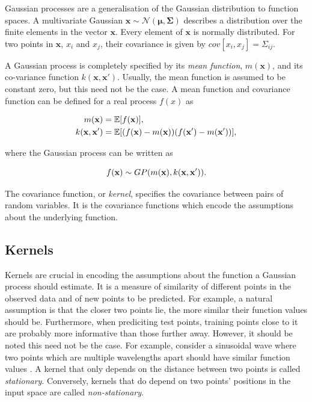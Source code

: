 \documentclass[12pt,a4paper]{report}
\theoremstyle{definition}
\begin{document}
Gaussian processes are a generalisation of the Gaussian distribution to function spaces. 
A multivariate Gaussian $\textbf{x} \sim \mathcal{N} (\boldsymbol{\mu}, \boldsymbol{\Sigma})$ describes a distribution over the finite elements in the vector $\textbf{x}$. 
Every element of $\textbf{x}$ is normally distributed. 
For two points in $\textbf{x}$, $x_{i}$ and $x_{j}$, their covariance is given by $cov[x_{i}, x_{j}] = \Sigma_{ij}$.

A Gaussian process is completely specified by its \emph{mean function}, $m(\textbf{x})$, and its co-variance function $k(\textbf{x}, \textbf{x}')$.
Usually, the mean function is assumed to be constant zero, but this need not be the case.
A mean function and covariance function can be defined for a real process $f(x)$ as 

\begin{equation}
	\begin{aligned}
		\centering
		m(\textbf{x}) &= \mathbb{E}[f(\textbf{x})],\\
		k(\textbf{x}, \textbf{x}') &= \mathbb{E}[(f(\textbf{x}) - m(\textbf{x}))(f(\textbf{x}') - m(\textbf{x}'))],
	\end{aligned}
\end{equation}

where the Gaussian process can be written as 

\begin{equation}
	\centering
	f(\textbf{x}) \sim GP(m(\textbf{x}), k(\textbf{x}, \textbf{x}')).
\end{equation}

The covariance function, or \emph{kernel}, specifies the covariance between pairs of random variables. It is the covariance functions which encode the assumptions about the underlying function.

\subsection{Kernels} \label{sec:Kernels}

Kernels are crucial in encoding the assumptions about the function a Gaussian process should estimate. 
It is a measure of similarity of different points in the observed data and of new points to be predicted. 
For example, a natural assumption is that the closer two points lie, the more similar their function values should be. 
Furthermore, when prediciting test points, training points close to it are probably more informative than those further away. 
However, it should be noted this need not be the case. 
For example, consider a sinusoidal wave where two points which are multiple wavelengths apart should have similar function values \citep{Kaiser2017}.
A kernel that only depends on the distance between two points is called \emph{stationary}.
Conversely, kernels that do depend on two points' positions in the input space are called \emph{non-stationary}.
\end{document}

